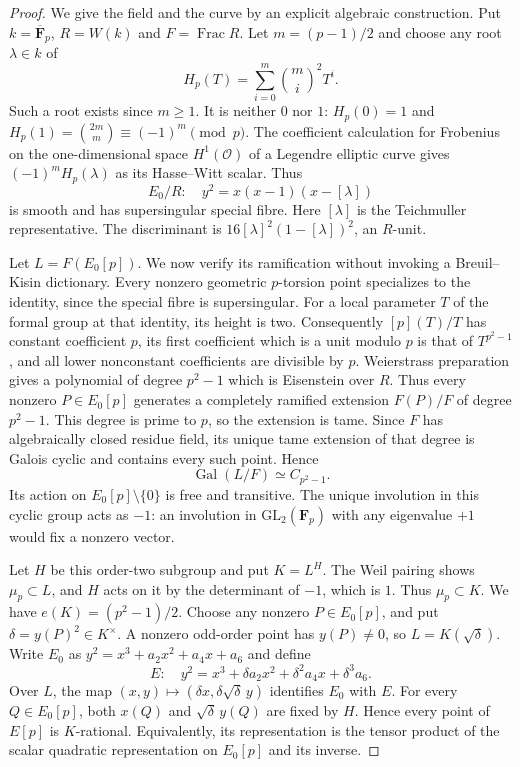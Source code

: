 \begin{proof}
We give the field and the curve by an explicit algebraic construction.
Put $k=\overline{\mathbf F}_p$, $R=W(k)$ and $F=\operatorname{Frac}R$.
Let $m=(p-1)/2$ and choose any root $\lambda\in k$ of
\[
 H_p(T)=\sum_{i=0}^{m}\binom mi^2T^i.
\]
Such a root exists since $m\geq1$. It is neither $0$ nor $1$:
$H_p(0)=1$ and
$H_p(1)=\binom{2m}{m}\equiv(-1)^m\pmod p$.
The coefficient calculation for Frobenius on the one-dimensional space
$H^1(\mathcal O)$ of a Legendre elliptic curve gives $(-1)^mH_p(\lambda)$
as its Hasse--Witt scalar. Thus
\[
 E_0/R:\quad y^2=x(x-1)(x-[\lambda])
\]
is smooth and has supersingular special fibre. Here $[\lambda]$ is the
Teichmuller representative. The discriminant is
$16[\lambda]^2(1-[\lambda])^2$, an $R$-unit.

Let $L=F(E_0[p])$. We now verify its ramification without invoking a
Breuil--Kisin dictionary. Every nonzero geometric $p$-torsion point
specializes to the identity, since the special fibre is supersingular.
For a local parameter $T$ of the formal group at that identity, its
height is two. Consequently $[p](T)/T$ has constant coefficient $p$,
its first coefficient which is a unit modulo $p$ is that of
$T^{p^2-1}$, and all lower nonconstant coefficients are divisible by $p$.
Weierstrass preparation gives a polynomial of degree $p^2-1$ which is
Eisenstein over $R$. Thus every nonzero $P\in E_0[p]$ generates a
completely ramified extension $F(P)/F$ of degree $p^2-1$. This degree is
prime to $p$, so the extension is tame. Since $F$ has algebraically
closed residue field, its unique tame extension of that degree is
Galois cyclic and contains every such point. Hence
\[
 \operatorname{Gal}(L/F)\simeq C_{p^2-1}.
\]
Its action on $E_0[p]\setminus\{0\}$ is free and transitive. The unique
involution in this cyclic group acts as $-1$: an involution in
$\mathrm{GL}_2(\mathbf F_p)$ with any eigenvalue $+1$ would fix a
nonzero vector.

Let $H$ be this order-two subgroup and put $K=L^H$. The Weil pairing
shows $\mu_p\subset L$, and $H$ acts on it by the determinant of $-1$,
which is $1$. Thus $\mu_p\subset K$. We have $e(K)=(p^2-1)/2$.
Choose any nonzero $P\in E_0[p]$, and put $\delta=y(P)^2\in K^\times$.
A nonzero odd-order point has $y(P)\ne0$, so $L=K(\sqrt\delta)$.
Write $E_0$ as $y^2=x^3+a_2x^2+a_4x+a_6$ and define
\[
 E:\quad y^2=x^3+\delta a_2x^2+\delta^2a_4x+\delta^3a_6.
\]
Over $L$, the map $(x,y)\mapsto(\delta x,\delta\sqrt\delta\,y)$
identifies $E_0$ with $E$. For every $Q\in E_0[p]$, both $x(Q)$ and
$\sqrt\delta\,y(Q)$ are fixed by $H$. Hence every point of $E[p]$
is $K$-rational. Equivalently, its representation is the tensor product
of the scalar quadratic representation on $E_0[p]$ and its inverse.


\end{proof}
